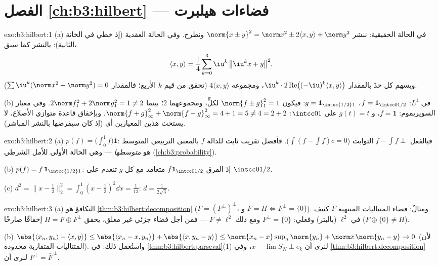 \section*{الفصل \ref{ch:b3:hilbert} --- فضاءات هيلبرت}

\begin{solution}{exo:b3:hilbert:1}
(a) في الحالة الحقيقية: ننشر $\norm{x \pm y}^2 = \norm x^2 \pm 2\langle
x,y\rangle + \norm y^2$ ونطرح. وفي الحالة العقدية
(إذ  خطي في الخانة الثانية): بالنشر كما سبق،
\[
\langle x, y\rangle = \frac14\sum_{k=0}^{3}
\iu^k\,\bigl\|\iu^kx + y\bigr\|^2,
\]
ويسهم كل حدّ بالمقدار $\iu^k\cdot2\operatorname{Re}\bigl(
(-\iu)^k\langle x,y\rangle\bigr)$، ومجموعه $4\langle
x,y\rangle$ (تحقق من قيم $k$
الأربع؛ فالمقدار $\sum\iu^k
(\norm x^2 + \norm y^2) = 0$).

(b) في $L^1$: $f = \mathbf 1_{\intcc0{1/2}}$، $g = \mathbf
1_{\intcc{1/2}1}$: فيكون $\norm{f\pm g}_1^2 = 1$ لكلٍّ، ومجموعهما $2$؛
بينما $2\norm f_1^2 + 2\norm g_1^2 = 1 \neq 2$. وفي معيار السوپريموم: $f =
\mathbf 1$، و $g(t) = t$ على
$\intcc01$: $\norm{f + g}_\infty^2 +
\norm{f-g}_\infty^2 = 4 + 1 = 5 \neq 4 = 2 + 2$. وبإخفاق قاعدة متوازي الأضلاع، لا يستحث هذين
المعيارين أي  (إذ كان سيفرضها بالنشر المباشر).
\end{solution}

\begin{solution}{exo:b3:hilbert:2}
(a) $p(f) = \bigl(\int_0^1f\bigr)\mathbf 1$: فبالفعل $f - \int f
\perp$ الثوابت ($\int(f - \int f)c = 0$). فأفضل تقريب ثابت
للدالة $f$ بالمعنى التربيعي المتوسط هو \emph{متوسطها} --- وهي
الحالة الأولى للأمل الشرطي (\cref{ch:b3:probability}).

(b) $p(f) = f\,\mathbf 1_{\intcc{1/2}1}$: إذ الفرق $f\mathbf 1_{\intcc0{1/2}}$ متعامد مع كل $g$ تنعدم على
$\intcc0{1/2}$.

(c) $d^2 = \bigl\|x - \tfrac12\bigr\|_2^2 = \int_0^1(x -
\tfrac12)^2\dd x = \tfrac1{12}$: $d = \frac1{2\sqrt3}$.
\end{solution}

\begin{solution}{exo:b3:hilbert:3}
(a) التكافؤ هو \cref{thm:b3:hilbert:decomposition} ($\bar F = (F^\perp)^\perp$، و $\bar F = H \iff F^\perp =
\{0\}$). ومثالٌ: فضاء
المتتاليات المنتهية $F$ كثيف في $\ell^2$ (بالبتر) وفعلي:
$F^\perp = \{0\}$ ومع ذلك $F
\neq \ell^2$ --- فمن أجل فضاء جزئي غير مغلق، يخفق
$H = F \oplus
F^\perp$ إخفاقًا صارخًا ($F \oplus \{0\} \neq H$).

(b) $\abs{\langle x_n, y_n\rangle - \langle x, y\rangle} \leq
\abs{\langle x_n - x, y_n\rangle} + \abs{\langle x, y_n -
y\rangle} \leq \norm{x_n - x}\sup_n\norm{y_n} + \norm
x\,\norm{y_n - y} \to 0$ (لأن المتتاليات المتقاربة محدودة). واستُعمل ذلك: في
\cref{thm:b3:hilbert:parseval}(1) لنرى أن $x - \lim
S_N \perp e_k$، وفي \cref{thm:b3:hilbert:decomposition} لنرى أن $F^\perp = \bar F^{\,\perp}$.
\end{solution}

